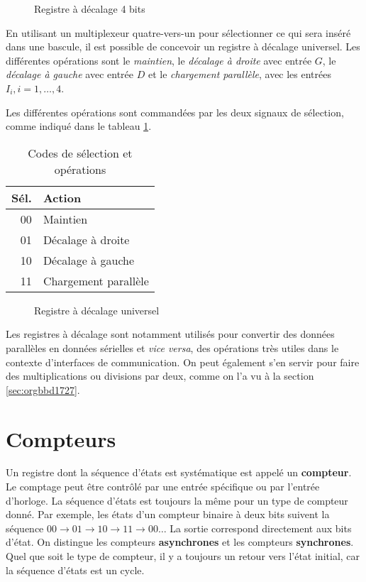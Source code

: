 \documentclass[letter, oneside]{book}
\begin{document}
\begin{enumerate}
\begin{figure}[htbp]
\centering

\caption{\label{fig:orgbdcf34e}Registre à décalage 4 bits}
\end{figure}

En utilisant un multiplexeur quatre-vers-un pour sélectionner ce qui
sera inséré dans une bascule, il est possible de concevoir un registre
à décalage universel. Les différentes opérations sont le \emph{maintien}, le
\emph{décalage à droite} avec entrée \(G\), le \emph{décalage à gauche} avec entrée
\(D\) et le \emph{chargement parallèle}, avec les entrées \(I_i, i=1, \ldots,
4\).

Les différentes opérations sont commandées par les deux signaux de
sélection, comme indiqué dans le tableau \ref{tab:orga142de5}.

\begin{table}[htbp]
\caption{\label{tab:orga142de5}Codes de sélection et opérations}
\centering
\begin{tabular}{rl}
Sél. & Action\\[0pt]
\hline
00 & Maintien\\[0pt]
01 & Décalage à droite\\[0pt]
10 & Décalage à gauche\\[0pt]
11 & Chargement parallèle\\[0pt]
\end{tabular}
\end{table}

\begin{figure}[htbp]
\centering

\caption{\label{fig:org7d13a4a}Registre à décalage universel}
\end{figure} 

Les registres à décalage sont notamment utilisés pour convertir des
données parallèles en données sérielles et \emph{vice versa}, des opérations
très utiles dans le contexte d'interfaces de communication. On peut
également s'en servir pour faire des multiplications ou divisions par
deux, comme on l'a vu à la section \ref{sec:orgbbd1727}.
\end{enumerate}

\section{Compteurs}
\label{sec:org69c9b00}

Un registre dont la séquence d'états est systématique est appelé un
\textbf{compteur}. Le comptage peut être contrôlé par une entrée spécifique
ou par l'entrée d'horloge. La séquence d'états est toujours la même
pour un type de compteur donné. Par exemple, les états d'un compteur
binaire à deux bits suivent la séquence \(00 \rightarrow 01
\rightarrow 10 \rightarrow 11 \rightarrow 00 \ldots\) La sortie
correspond directement aux bits d'état. On distingue les compteurs
\textbf{asynchrones} et les compteurs \textbf{synchrones}. Quel que soit le type de
compteur, il y a toujours un retour vers l'état initial, car la
séquence d'états est un cycle.
\end{document}
